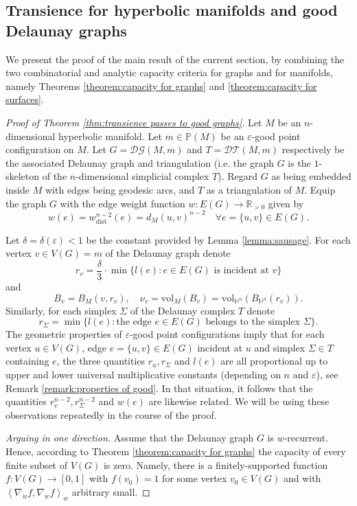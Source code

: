 \documentclass{amsart}
\newcommand{\HH}{\mathbb{H}}
\newcommand{\Points}{\mathbb{P}}
\newcommand{\DelanGraph}{\mathcal{DG}}
\newcommand{\DelanComplex}{\mathcal{DT}}
\newcommand{\vol}{\mathrm{vol}}
\theoremstyle{plain}
\numberwithin{equation}{section}
\theoremstyle{definition}
\begin{document}
\subsection{Transience for hyperbolic manifolds and good Delaunay graphs}

We present the 
proof of the main result of the current section, by combining the two combinatorial and analytic capacity criteria for graphs and for manifolds, namely Theorems \ref{theorem:capacity for graphs} and \ref{theorem:capacity for surfaces}.

\begin{proof}[Proof of Theorem \ref{thm:transience passes to good graphs}]
Let $M$ be an $n$-dimensional hyperbolic manifold. Let $m \in \Points(M)$ be an $\varepsilon$-good point configuration on $M$. Let $G=\DelanGraph(M,m)$ and $T = \DelanComplex(M,m)$ respectively be the associated Delaunay graph and triangulation (i.e. the graph $G$ is the $1$-skeleton of the $n$-dimensional simplicial complex $T$). Regard  $G$ as being embedded inside $M$ with edges being geodesic arcs, and $T$ as a triangulation of $M$. 
Equip the graph $G$ with the edge weight function 
$ w : E(G) \to \mathbb{R}_{> 0}$ given by $$ w(e)=w_\textrm{dist}^{n-2}(e) = d_M(u,v)^{n-2} \quad \forall e=\{u,v\} \in E(G).$$

Let $\delta = \delta(\varepsilon) < 1$ be the constant provided by Lemma \ref{lemma:sausage}. For each vertex $v \in V(G) = m$ of the Delaunay graph denote 
$$r_v = \frac{\delta}{3} \cdot \min \{ l(e) : \text{$e\in E(G)$ is incident at $v$} \}$$
and $$B_v = B_{M}(v,r_v), \quad \nu_v=\vol_M(B_v)=\vol_{\HH^n}(B_{\HH^n}(r_v)).$$ 
Similarly, for each simplex $\Sigma$ of the Delaunay complex $T$ denote
$$ r_\Sigma = \min \{ l(e) : \text{the edge $e\in E(G)$ belongs to the simplex $\Sigma$} \}.$$
The geometric properties of $\varepsilon$-good point configurations imply that for each vertex $u \in V(G)$, edge $e = \{u,v\} \in E(G)$ incident at $u$ and simplex $\Sigma \in T$ containing $e$, the three quantities $r_u, r_\Sigma$ and $l(e)$ are all proportional up to  upper and lower universal multiplicative constants (depending on $n$ and $\varepsilon$), see Remark \ref{remark:properties of good}. In that situation, it follows that the quantities $r_v^{n-2}, r_\Sigma^{n-2}$ and $w(e)$ are likewise related. We will be using these observations repeatedly in the course of the proof.

\emph{Arguing in one direction.} Assume that the Delaunay graph $G$ is $w$-recurrent. Hence, according to Theorem \ref{theorem:capacity for graphs} the capacity of every finite subset of $V(G)$ is zero. Namely, there is a finitely-supported function $f : V(G) \to \left[0,1\right]$ with $f(v_0) = 1$ for some vertex $v_0 \in V(G)$ and with $\left< \nabla_w f, \nabla_w f\right>_w $ arbitrary small.


\end{proof}
\end{document}
